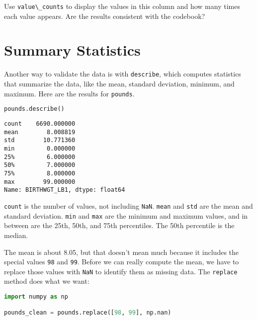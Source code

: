 Use \passthrough{\lstinline!value\_counts!} to display the values in
this column and how many times each value appears. Are the results
consistent with the codebook?

\pagebreak

\section{Summary Statistics}\label{summary-statistics}

Another way to validate the data is with
\passthrough{\lstinline!describe!}, which computes statistics that
summarize the data, like the mean, standard deviation, minimum, and
maximum. Here are the results for \passthrough{\lstinline!pounds!}.


\begin{lstlisting}[language=Python,style=source]
pounds.describe()
\end{lstlisting}

\begin{lstlisting}[style=output]
count    6690.000000
mean        8.008819
std        10.771360
min         0.000000
25%         6.000000
50%         7.000000
75%         8.000000
max        99.000000
Name: BIRTHWGT_LB1, dtype: float64
\end{lstlisting}

\passthrough{\lstinline!count!} is the number of values, not including
\passthrough{\lstinline!NaN!}. \passthrough{\lstinline!mean!} and
\passthrough{\lstinline!std!} are the mean and standard deviation.
\passthrough{\lstinline!min!} and \passthrough{\lstinline!max!} are the
minimum and maximum values, and in between are the 25th, 50th, and 75th
percentiles. The 50th percentile is the median.

The mean is about 8.05, but that doesn't mean much because it includes
the special values \passthrough{\lstinline!98!} and
\passthrough{\lstinline!99!}. Before we can really compute the mean, we
have to replace those values with \passthrough{\lstinline!NaN!} to
identify them as missing data. The \passthrough{\lstinline!replace!}
method does what we want:

\begin{lstlisting}[language=Python,style=source]
import numpy as np

pounds_clean = pounds.replace([98, 99], np.nan)
\end{lstlisting}

